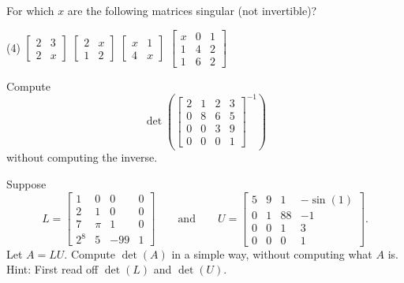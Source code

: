 \begin{exercise}
For which $x$ are the following matrices singular (not invertible)?
\begin{tasks}(4)
\task
$\begin{bmatrix}
2 & 3 \\
2 & x
\end{bmatrix}$
\task
$\begin{bmatrix}
2 & x \\
1 & 2
\end{bmatrix}$
\task
$\begin{bmatrix}
x & 1 \\
4 & x
\end{bmatrix}$
\task
$\begin{bmatrix}
x & 0 & 1 \\
1 & 4 & 2 \\
1 & 6 & 2
\end{bmatrix}$
\end{tasks}
\end{exercise}

\begin{exercise}
Compute
\begin{equation*}
\det \left( \begin{bmatrix}
2 & 1 & 2 & 3 \\
0 & 8 & 6 & 5 \\
0 & 0 & 3 & 9 \\
0 & 0 & 0 & 1
\end{bmatrix}^{-1}
\right)
\end{equation*}
without computing the inverse.
\end{exercise}

\begin{exercise}
Suppose
\begin{equation*}
L = \begin{bmatrix}
1 & 0 & 0 & 0 \\
2 & 1 & 0 & 0 \\
7 & \pi & 1 & 0 \\
2^8 & 5 & -99 & 1
\end{bmatrix}
\qquad \text{and} \qquad
U = \begin{bmatrix}
5 & 9 & 1 & -\sin(1) \\
0 & 1 & 88 & -1 \\
0 & 0 & 1 & 3 \\
0 & 0 & 0 & 1
\end{bmatrix} .
\end{equation*}
Let $A = LU$.  Compute $\det(A)$ in a simple way, without computing what $A$
is.
Hint: First read off $\det(L)$ and $\det(U)$.
\end{exercise}


